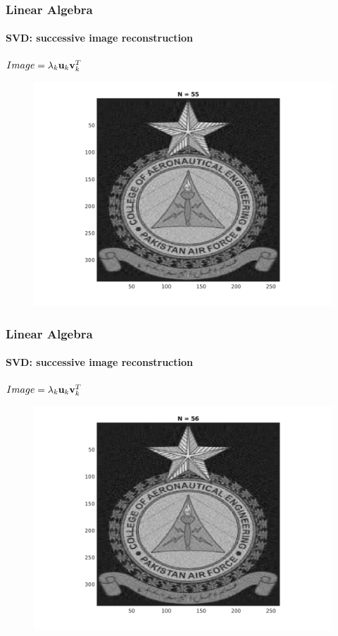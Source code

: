 \documentclass[hyperref={pdfpagelabels=true}]{beamer}
\begin{document}
\begin{frame}
\frametitle{Linear Algebra}
\framesubtitle{SVD: successive image reconstruction} 
\small{
\begin{center}
$Image = \lambda_k{\bf u}_k {\bf v}_k^T$
\end{center}}
\begin{figure}[!htb]
\centering
\includegraphics [scale=0.48]{n/b55.png}
\end{figure}
\end{frame}

\begin{frame}
\frametitle{Linear Algebra}
\framesubtitle{SVD: successive image reconstruction} 
\small{
\begin{center}
$Image = \lambda_k{\bf u}_k {\bf v}_k^T$
\end{center}}
\begin{figure}[!htb]
\centering
\includegraphics [scale=0.48]{n/b56.png}
\end{figure}
\end{frame}
\end{document}
